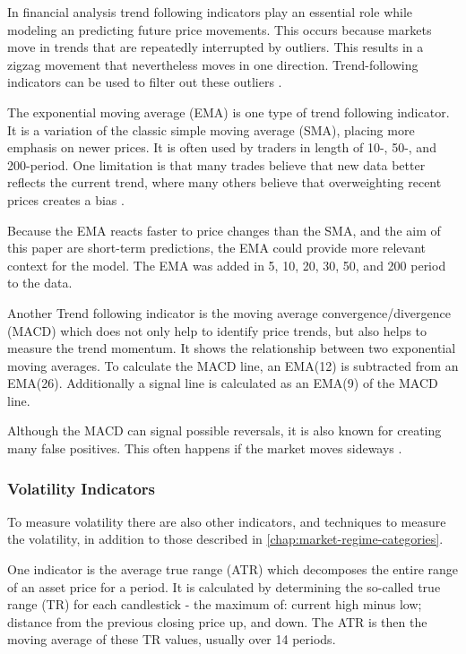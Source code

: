 In financial analysis trend following indicators play an essential role while modeling an predicting future price movements. This occurs because markets move in trends that are repeatedly interrupted by outliers. This results in a zigzag movement that nevertheless moves in one direction. Trend-following indicators can be used to filter out these outliers \cite{investopia-trend-indicators}.

The exponential moving average (EMA) is one type of trend following indicator. It is a variation of the classic simple moving average (SMA), placing more emphasis on newer prices. It is often used by traders in length of 10-, 50-, and 200-period. One limitation is that many trades believe that new data better reflects the current trend, where many others believe that overweighting recent prices creates a bias \cite{investopia-ema}.


Because the EMA reacts faster to price changes than the SMA, and the aim of this paper are short-term predictions, the EMA could provide more relevant context for the model. The EMA was added in 5, 10, 20, 30, 50, and 200 period to the data.

Another Trend following indicator is the moving average convergence/divergence (MACD) which does not only help to identify price trends, but also helps to measure the trend momentum. It shows the relationship between two exponential moving averages. To calculate the MACD line, an EMA(12) is subtracted from an EMA(26). Additionally a signal line is calculated as an EMA(9) of the MACD line.

Although the MACD can signal possible reversals, it is also known for creating many false positives. This often happens if the market moves sideways \cite{investopia-macd}.

\subsubsection{Volatility Indicators}

To measure volatility there are also other indicators, and techniques to measure the volatility, in addition to those described in \autoref{chap:market-regime-categories}.

One indicator is the average true range (ATR) which decomposes the entire range of an asset price for a period. It is calculated by determining the so-called true range (TR) for each candlestick - the maximum of: current high minus low; distance from the previous closing price up, and down. The ATR is then the moving average of these TR values, usually over 14 periods.

